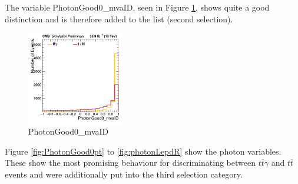 \documentclass[11pt]{scrartcl}
\begin{document}
The variable PhotonGood0\_mvaID, seen in Figure \ref{fig:PhotonGood0mvaID}, shows quite a good distinction and is therefore added to the list (second selection).

	\begin{figure}[H]
	\centering
	\includegraphics[width=0.38\textwidth]{figures/Select2/PhotonGood0_mvaID.png}
	\caption{PhotonGood0\_mvaID}
 	\label{fig:PhotonGood0mvaID}
	\end{figure}
	
Figure \ref{fig:PhotonGood0pt} to \ref{fig:photonLepdR} show the photon variables. These show the most promising behaviour for discriminating between $t\overline{t}\gamma$ and $t\overline{t}$ events and were additionally put into the third selection category.
\end{document}
